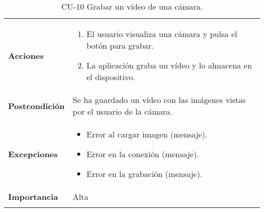 \begin{longtable}[h!]{@{}ll@{}}
\begin{minipage}[t]{0.23\columnwidth}
\textbf{Acciones}\strut
\end{minipage} & \begin{minipage}[t]{0.71\columnwidth}\raggedright\strut
\begin{enumerate}
\def\labelenumi{\arabic{enumi}.}
\tightlist
\item
  El usuario visualiza una cámara y pulsa el botón para grabar.
\item
  La aplicación graba un vídeo y lo almacena en el dispositivo.
\end{enumerate}\strut
\end{minipage}\tabularnewline
\begin{minipage}[t]{0.23\columnwidth}\raggedright\strut
\textbf{Postcondición}\strut
\end{minipage} & \begin{minipage}[t]{0.71\columnwidth}\raggedright\strut
Se ha guardado un vídeo con las imágenes vistas por el usuario de la cámara.\strut
\end{minipage}\tabularnewline
\begin{minipage}[t]{0.23\columnwidth}\raggedright\strut
\textbf{Excepciones}\strut
\end{minipage} & \begin{minipage}[t]{0.71\columnwidth}\raggedright\strut
\begin{itemize}
\tightlist
\item
  Error al cargar imagen (mensaje).
\item
  Error en la conexión (mensaje).
\item
  Error en la grabación (mensaje).
\end{itemize}\strut
\end{minipage}\tabularnewline
\begin{minipage}[t]{0.23\columnwidth}\raggedright\strut
\textbf{Importancia}\strut
\end{minipage} & \begin{minipage}[t]{0.71\columnwidth}\raggedright\strut
Alta\strut
\end{minipage}\tabularnewline
\bottomrule
\caption{CU-10 Grabar un vídeo de una cámara.}
\end{longtable}


